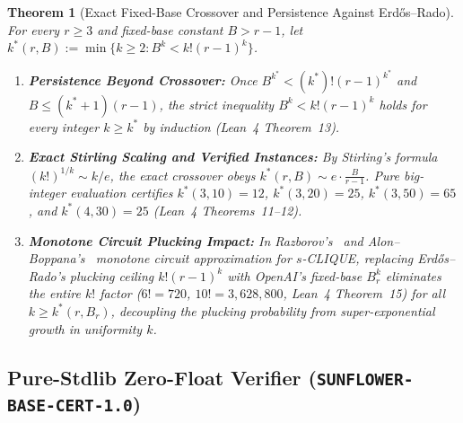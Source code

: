 \documentclass[11pt,a4paper]{article}
\newtheorem{theorem}{Theorem}[section]
\theoremstyle{definition}
\theoremstyle{remark}
\newcommand{\certschema}{\texttt{SUNFLOWER-BASE-CERT-1.0}}
\begin{document}
\begin{theorem}[Exact Fixed-Base Crossover and Persistence Against Erd\H{o}s--Rado]\label{thm:crossover}
For every $r \ge 3$ and fixed-base constant $B > r - 1$, let $k^*(r, B) := \min\{k \ge 2 : B^k < k!(r-1)^k\}$.
\begin{enumerate}[leftmargin=1.8em,itemsep=2pt]
  \item \textbf{Persistence Beyond Crossover:} Once $B^{k^*} < (k^*)!(r-1)^{k^*}$ and $B \le (k^* + 1)(r-1)$, the strict inequality $B^k < k!(r-1)^k$ holds for \emph{every} integer $k \ge k^*$ by induction (Lean~4 Theorem~13).
  \item \textbf{Exact Stirling Scaling and Verified Instances:} By Stirling's formula $(k!)^{1/k} \sim k/e$, the exact crossover obeys $k^*(r, B) \sim e \cdot \frac{B}{r-1}$. Pure big-integer evaluation certifies $k^*(3,10) = 12$, $k^*(3,20) = 25$, $k^*(3,50) = 65$, and $k^*(4,30) = 25$ (Lean~4 Theorems~11--12).
  \item \textbf{Monotone Circuit Plucking Impact:} In Razborov's~\cite{razborov1985lower} and Alon--Boppana's~\cite{alon1987monotone} monotone circuit approximation for $s$-CLIQUE, replacing Erd\H{o}s--Rado's plucking ceiling $k!(r-1)^k$ with OpenAI's fixed-base $B_r^k$ eliminates the entire $k!$ factor ($6! = 720$, $10! = 3{,}628{,}800$, Lean~4 Theorem~15) for all $k \ge k^*(r, B_r)$, decoupling the plucking probability from super-exponential growth in uniformity $k$.
\end{enumerate}
\end{theorem}

\subsection{Pure-Stdlib Zero-Float Verifier (\texorpdfstring{\certschema{}}{SUNFLOWER-BASE-CERT-1.0})}
\end{document}
